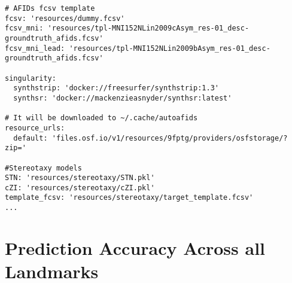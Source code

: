 \begin{verbatim}
# AFIDs fcsv template
fcsv: 'resources/dummy.fcsv'
fcsv_mni: 'resources/tpl-MNI152NLin2009cAsym_res-01_desc-groundtruth_afids.fcsv'
fcsv_mni_lead: 'resources/tpl-MNI152NLin2009bAsym_res-01_desc-groundtruth_afids.fcsv'

singularity:
  synthstrip: 'docker://freesurfer/synthstrip:1.3'
  synthsr: 'docker://mackenzieasnyder/synthsr:latest'

# It will be downloaded to ~/.cache/autoafids
resource_urls:
  default: 'files.osf.io/v1/resources/9fptg/providers/osfstorage/?zip='

#Stereotaxy models 
STN: 'resources/stereotaxy/STN.pkl'
cZI: 'resources/stereotaxy/cZI.pkl'
template_fcsv: 'resources/stereotaxy/target_template.fcsv'
...
\end{verbatim}

\newpage
\section{Prediction Accuracy Across all Landmarks}

